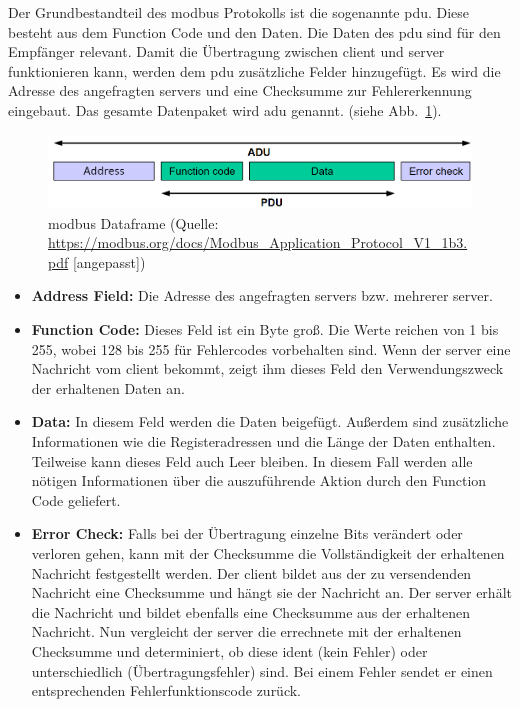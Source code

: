 Der Grundbestandteil des \gls{modbus} Protokolls ist die sogenannte \acf{pdu}. Diese besteht aus dem Function Code und den Daten. Die Daten des \acs{pdu} sind für den Empfänger relevant. Damit die Übertragung zwischen \gls{client} und \gls{server} funktionieren kann, werden dem \acs{pdu} zusätzliche Felder hinzugefügt. Es wird die Adresse des angefragten \gls{server}s und eine Checksumme zur Fehlererkennung eingebaut. Das gesamte Datenpaket wird \acf{adu} genannt.
(siehe Abb.~\ref{fig:modbus_adu_pdu}).
\begin{figure}[ht]
	\centering
	\includegraphics[width=1.0\linewidth]{Bilder/General_Modbus_Frame_Changed}
	\caption{\gls{modbus} Dataframe (Quelle: \url{https://modbus.org/docs/Modbus_Application_Protocol_V1_1b3.pdf} [angepasst])}
	\label{fig:modbus_adu_pdu}
\end{figure}

\begin{itemize}
	\item \textbf{Address Field:} Die Adresse des angefragten \gls{server}s bzw. mehrerer \gls{server}.
	\item \textbf{Function Code:} Dieses Feld ist ein Byte groß. Die Werte reichen von 1 bis 255, wobei 128 bis 255 für Fehlercodes vorbehalten sind. Wenn der \gls{server} eine Nachricht vom \gls{client} bekommt, zeigt ihm dieses Feld den Verwendungszweck der erhaltenen Daten an. 
	\item \textbf{Data:} In diesem Feld werden die Daten beigefügt. Außerdem sind zusätzliche Informationen wie die Registeradressen und die Länge der Daten enthalten. Teilweise kann dieses Feld auch Leer bleiben. In diesem Fall werden alle nötigen Informationen über die auszuführende Aktion durch den Function Code geliefert.
	\item \textbf{Error Check:} Falls bei der Übertragung einzelne Bits verändert oder verloren gehen, kann mit der Checksumme die Vollständigkeit der erhaltenen Nachricht festgestellt werden. Der \gls{client} bildet aus der zu versendenden Nachricht eine Checksumme und hängt sie der Nachricht an. Der \gls{server} erhält die Nachricht und bildet ebenfalls eine Checksumme aus der erhaltenen Nachricht. Nun vergleicht der \gls{server} die errechnete mit der erhaltenen Checksumme und determiniert, ob diese ident (kein Fehler) oder unterschiedlich (Übertragungsfehler) sind. Bei einem Fehler sendet er einen entsprechenden Fehlerfunktionscode zurück.
\end{itemize}

